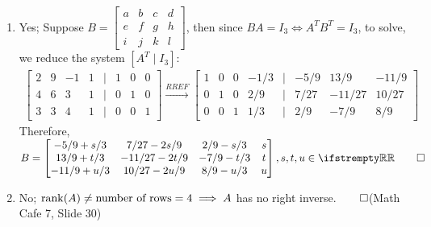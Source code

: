 \documentclass[12pt, a4paper]{article}
\begin{document}
\begin{enumerate}[Q\arabic*.]
\begin{enumerate}[(\alph*)]
    \item Yes; Suppose $B = \begin{bmatrix}a & b & c & d\\e & f & g & h\\i & j & k & l\end{bmatrix}$, then since $BA = I_3 \iff A^TB^T = I_3$, to solve, we reduce the system $[A^T \mid I_3]$:
      \begin{align*}
        \begin{bmatrix}
          2 & 9 & -1 & 1 & \mid & 1 & 0 & 0\\
          4 & 6 & 3 & 1 & \mid & 0 & 1 & 0\\
          3 & 3 & 4 & 1 & \mid & 0 & 0 & 1
        \end{bmatrix}\xrightarrow{RREF}
        \begin{bmatrix}
          1 & 0 & 0 & -1 /3 & \mid & -5 /9 & 13 /9 & -11 /9\\
          0 & 1 & 0 & 2 /9 & \mid & 7 /27 & -11 /27 & 10 /27\\
          0 & 0 & 1 & 1 /3 & \mid & 2 /9 & -7 /9 & 8 /9
        \end{bmatrix}
      \end{align*}
      Therefore, $B = \begin{bmatrix}
        -5 /9 + s /3 & 7 /27 - 2s /9 & 2 /9 - s /3 & s\\
        13 /9 + t /3 & -11 /27 -2t /9 & -7 /9 -t /3 & t\\
        -11 /9 + u /3 & 10 /27 -2u /9 & 8 /9 - u /3 & u
      \end{bmatrix}, s, t, u \in \RR \qed$

    \item No; $\operatorname{rank}(A) \neq \text{number of rows}= 4 \implies A$ has no right inverse.$\qed$\hfill(Math Cafe 7, Slide 30)


\end{enumerate}
\end{enumerate}
\end{document}
